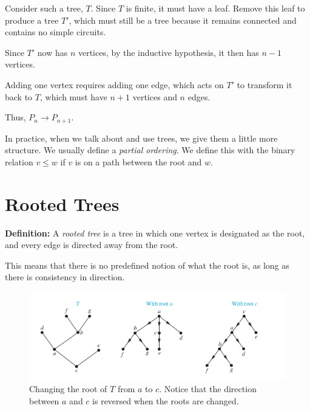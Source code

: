 \documentclass[a4paper,10pt]{report}
\begin{document}
Consider such a tree, $T$. Since $T$ is finite, it must have a leaf. Remove this leaf to produce a tree $T'$, which must still be a tree because it remains connected and contains no simple circuits.

Since $T'$ now has $n$ vertices, by the inductive hypothesis, it then has $n-1$ vertices.

Adding one vertex requires adding one edge, which acts on $T'$ to transform it back to $T$, which must have $n+1$ vertices and $n$ edges.

\centering
Thus, $P_n \rightarrow P_{n+1}$. $\qquad$

\hrulefill

In practice, when we talk about and use trees, we give them a little more structure. We usually define a \textit{partial ordering}. We define this with the binary relation $v\leq w$ if $v$ is on a path between the root and $w$.


\chapter{Rooted Trees}
\textbf{Definition:} A \textit{rooted tree} is a tree in which one vertex is designated as the root, and every edge is directed away from the root.

This means that there is no predefined notion of what the root is, as long as there is consistency in direction.
\begin{figure}[h!]
	\begin{centering}
	\begin{center}
	\includegraphics[width=\linewidth]{./changing_roots.png}
	\caption{Changing the root of $T$ from $a$ to $c$. Notice that the direction between $a$ and $c$ is reversed when the roots are changed.}
	\label{fig:changing_roots}
	\end{center}
	\par\end{centering}
\end{figure}
\end{document}
